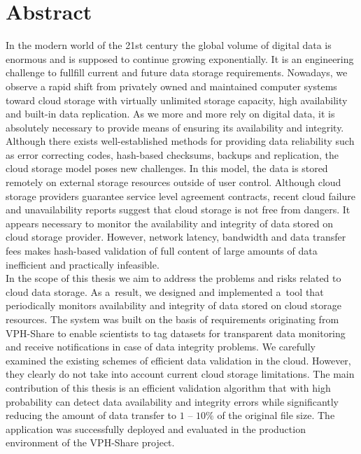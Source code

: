 \documentclass[pdflatex,en]{aghdpl}  %
\begin{document}
\chapter*{Abstract}
{}
In the modern world of the 21st century the global volume of digital
data is enormous and is supposed to continue growing exponentially.
It is an engineering challenge to fullfill current and future data
storage requirements. Nowadays, we observe a rapid shift from privately
owned and maintained computer systems toward cloud storage with virtually
unlimited storage capacity, high availability and built-in data replication.
As we more and more rely on digital data, it is absolutely necessary to provide means
of ensuring its availability and integrity. Although there exists well-established
methods for providing data reliability such as error correcting codes, hash-based
checksums, backups and replication, the cloud storage model poses new challenges.
In this model, the data is stored remotely on external storage resources outside of
user control. Although cloud storage providers guarantee service level agreement contracts,
recent cloud failure and unavailability reports suggest that cloud storage is not
free from dangers. It appears necessary to monitor the availability and integrity of
data stored on cloud storage provider. However, network latency, bandwidth and data
transfer fees makes hash-based validation of full content of large amounts of data
inefficient and practically infeasible.\\

In the scope of this thesis we aim to address the problems and risks related to
cloud data storage. As a~result, we designed and implemented a~tool that periodically
monitors availability and integrity of data stored on cloud storage resources. The system
was built on the basis of requirements originating from VPH-Share to enable scientists
to tag datasets for transparent data monitoring and receive notifications in case of data
integrity problems. We carefully examined the existing schemes of efficient data validation
in the cloud. However, they clearly do not take into account current cloud storage limitations.
The main contribution of this thesis is an efficient validation algorithm that with high
probability can detect data availability and integrity errors while significantly reducing
the amount of data transfer to $1$ -- $10\%$ of the original file size. The application was
successfully deployed and evaluated in the production environment of the VPH-Share project.\\
\end{document}
